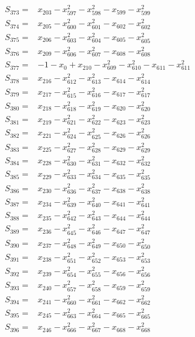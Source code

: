 \begin{align*}
S_{373}={}&x_{203}-x_{597}^{2}-x_{598}^{2}-x_{599}-x_{599}^{2}\\[3pt]
S_{374}={}&x_{205}-x_{600}^{2}-x_{601}^{2}-x_{602}-x_{602}^{2}\\[3pt]
S_{375}={}&x_{206}-x_{603}^{2}-x_{604}^{2}-x_{605}-x_{605}^{2}\\[3pt]
S_{376}={}&x_{209}-x_{606}^{2}-x_{607}^{2}-x_{608}-x_{608}^{2}\\[3pt]
S_{377}={}&-1-x_{0}+x_{210}-x_{609}^{2}-x_{610}^{2}-x_{611}-x_{611}^{2}\\[3pt]
S_{378}={}&x_{216}-x_{612}^{2}-x_{613}^{2}-x_{614}-x_{614}^{2}\\[3pt]
S_{379}={}&x_{217}-x_{615}^{2}-x_{616}^{2}-x_{617}-x_{617}^{2}\\[3pt]
S_{380}={}&x_{218}-x_{618}^{2}-x_{619}^{2}-x_{620}-x_{620}^{2}\\[3pt]
S_{381}={}&x_{219}-x_{621}^{2}-x_{622}^{2}-x_{623}-x_{623}^{2}\\[3pt]
S_{382}={}&x_{221}-x_{624}^{2}-x_{625}^{2}-x_{626}-x_{626}^{2}\\[3pt]
S_{383}={}&x_{225}-x_{627}^{2}-x_{628}^{2}-x_{629}-x_{629}^{2}\\[3pt]
S_{384}={}&x_{228}-x_{630}^{2}-x_{631}^{2}-x_{632}-x_{632}^{2}\\[3pt]
S_{385}={}&x_{229}-x_{633}^{2}-x_{634}^{2}-x_{635}-x_{635}^{2}\\[3pt]
S_{386}={}&x_{230}-x_{636}^{2}-x_{637}^{2}-x_{638}-x_{638}^{2}\\[3pt]
S_{387}={}&x_{234}-x_{639}^{2}-x_{640}^{2}-x_{641}-x_{641}^{2}\\[3pt]
S_{388}={}&x_{235}-x_{642}^{2}-x_{643}^{2}-x_{644}-x_{644}^{2}\\[3pt]
S_{389}={}&x_{236}-x_{645}^{2}-x_{646}^{2}-x_{647}-x_{647}^{2}\\[3pt]
S_{390}={}&x_{237}-x_{648}^{2}-x_{649}^{2}-x_{650}-x_{650}^{2}\\[3pt]
S_{391}={}&x_{238}-x_{651}^{2}-x_{652}^{2}-x_{653}-x_{653}^{2}\\[3pt]
S_{392}={}&x_{239}-x_{654}^{2}-x_{655}^{2}-x_{656}-x_{656}^{2}\\[3pt]
S_{393}={}&x_{240}-x_{657}^{2}-x_{658}^{2}-x_{659}-x_{659}^{2}\\[3pt]
S_{394}={}&x_{241}-x_{660}^{2}-x_{661}^{2}-x_{662}-x_{662}^{2}\\[3pt]
S_{395}={}&x_{245}-x_{663}^{2}-x_{664}^{2}-x_{665}-x_{665}^{2}\\[3pt]
S_{396}={}&x_{246}-x_{666}^{2}-x_{667}^{2}-x_{668}-x_{668}^{2}\\[3pt]

\end{align*}

